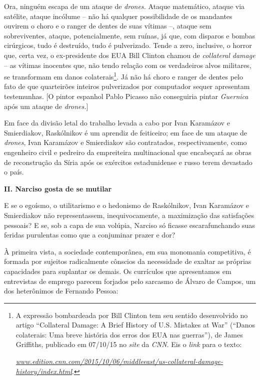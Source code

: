 Ora, ninguém escapa de um ataque de \emph{drones.} Ataque matemático,
ataque via satélite, ataque incólume -- não há qualquer possibilidade de
os mandantes ouvirem o choro e o ranger de dentes de suas vítimas --,
ataque sem sobreviventes, ataque, potencialmente, sem ruínas, já que,
com disparos e bombas cirúrgicos, tudo é destruído, tudo é pulverizado.
Tende a zero, inclusive, o horror que, certa vez, o ex-presidente dos
EUA Bill Clinton chamou de \emph{collateral damage} -- as vítimas
inocentes que, não tendo relação com os verdadeiros alvos militares, se
transformam em danos colaterais\footnote{A expressão bombardeada por
  Bill Clinton tem seu sentido desenvolvido no artigo ``Collateral
  Damage: A Brief History of U.S. Mistakes at War'' (``Danos colaterais:
  Uma breve história dos erros dos EUA nas guerras''), de James
  Griffiths, publicado em 07/10/15 no \emph{site} da \emph{CNN}. Eis o
  \emph{link} para o texto:

  \href{http://www.edition.cnn.com/2015/10/06/middleeast/us-collateral-damage-history/index.html}{\emph{www.edition.cnn.com/2015/10/06/middleeast/us-collateral-damage-history/index.html}}.}.
Já não há choro e ranger de dentes pelo fato de que quarteirões inteiros
pulverizados por computador sequer apresentam testemunhas. {[}O pintor
espanhol Pablo Picasso não conseguiria pintar \emph{Guernica} após um
ataque de \emph{drones.}{]}

Em face da divisão letal do trabalho levada a cabo por Ivan Karamázov e
Smierdiakov, Raskólnikov é um aprendiz de feiticeiro; em face de um
ataque de \emph{drones}, Ivan Karamázov e Smierdiakov são contratados,
respectivamente, como engenheiro civil e pedreiro da empreiteira
multinacional que encabeçará as obras de reconstrução da Síria após os
exércitos estadunidense e russo terem devastado o país.

\textbf{II. Narciso gosta de se mutilar}

E se o egoísmo, o utilitarismo e o hedonismo de Raskólnikov, Ivan
Karamázov e Smierdiakov não representassem, inequivocamente, a
maximização das satisfações pessoais? E se, sob a capa de sua volúpia,
Narciso só ficasse escarafunchando suas feridas purulentas como que a
conjuminar prazer e dor?

À primeira vista, a sociedade contemporânea, em sua monomania
competitiva, é formada por sujeitos radicalmente cônscios da necessidade
de exaltar as próprias capacidades para suplantar os demais. Os
currículos que apresentamos em entrevistas de emprego parecem forjados
pelo sarcasmo de Álvaro de Campos, um dos heterônimos de Fernando
Pessoa:

